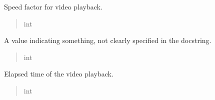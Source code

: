 \documentclass[letterpaper,10pt,english]{sphinxmanual}
\begin{document}
\begin{fulllineitems}
\begin{fulllineitems}
\begin{quote}
\begin{description}
\end{description}\end{quote}

\end{fulllineitems}


\begin{fulllineitems}
\label{\detokenize{general_interface:general_interface_V10.LecteurVideo.vitesse_lecture}}
\pysigstartsignatures
{}
\pysigstopsignatures
\sphinxAtStartPar
Speed factor for video playback.
\begin{quote}\begin{description}
\sphinxAtStartPar
int

\end{description}\end{quote}

\end{fulllineitems}


\begin{fulllineitems}
\label{\detokenize{general_interface:general_interface_V10.LecteurVideo.valeur}}
\pysigstartsignatures
{}
\pysigstopsignatures
\sphinxAtStartPar
A value indicating something, not clearly specified in the docstring.
\begin{quote}\begin{description}
\sphinxAtStartPar
int

\end{description}\end{quote}

\end{fulllineitems}


\begin{fulllineitems}
\label{\detokenize{general_interface:general_interface_V10.LecteurVideo.temps_ecoule}}
\pysigstartsignatures
{}
\pysigstopsignatures
\sphinxAtStartPar
Elapsed time of the video playback.
\begin{quote}\begin{description}
\sphinxAtStartPar
int


\end{description}
\end{quote}
\end{fulllineitems}
\end{fulllineitems}
\end{document}

